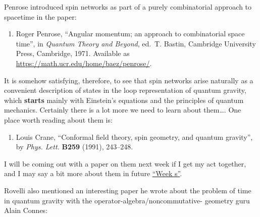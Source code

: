 \documentclass[12pt]{article}
\def\tightlist{}
\begin{document}
Penrose introduced spin networks as part of a purely combinatorial
approach to spacetime in the paper:

\begin{enumerate}
\def\labelenumi{\arabic{enumi})}
\setcounter{enumi}{1}
\tightlist
\item
  Roger Penrose, ``Angular momentum; an approach to combinatorial space time'', 
   in \emph{Quantum Theory and Beyond}, ed.~T. Bastin,
  Cambridge University Press, Cambridge, 1971.  Available as 
  \href{https://math.ucr.edu/home/baez/penrose/}{https://math.ucr.edu/home/baez/penrose/}.
\end{enumerate}
\noindent
It is somehow satisfying, therefore, to see that spin networks arise
naturally as a convenient description of states in the loop
representation of quantum gravity, which \textbf{starts} mainly with
Einstein's equations and the principles of quantum mechanics. Certainly
there is a lot more we need to learn about them\ldots. One place worth
reading about them is:

\begin{enumerate}
\def\labelenumi{\arabic{enumi})}
\setcounter{enumi}{2}
\tightlist
\item
 Louis Crane,  ``Conformal field theory, spin geometry, and quantum gravity'', by
  \emph{Phys. Lett.} \textbf{B259} (1991), 243--248.
\end{enumerate}
\noindent
I will be coming out with a paper on them next week if I get my act
together, and I may say a bit more about them in future
\protect\hyperlink{weeks}{``Week s''}.

Rovelli also mentioned an interesting paper he wrote about the problem
of time in quantum gravity with the operator-algebra/noncommutative-
geometry guru Alain Connes:
\end{document}
